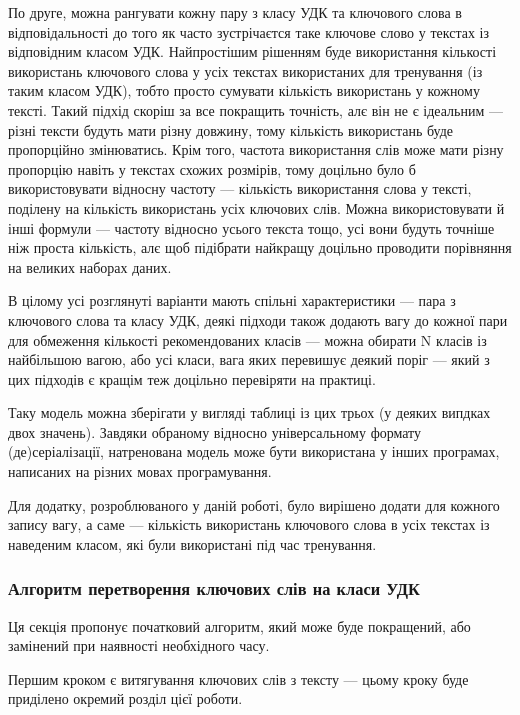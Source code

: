 \documentclass[14pt]{extarticle}
\begin{document}
  По друге, можна рангувати \cite{wiki_weight_function}
  кожну пару з класу УДК та ключового слова
  в відповідальності до того як часто зустрічаєтся таке ключове слово
  у текстах із відповідним класом УДК.
  Найпростішим рішенням буде використання кількості
  використань ключового слова у усіх текстах використаних для тренування
  (із таким класом УДК),
  тобто просто сумувати кількість використань у кожному тексті.
  Такий підхід скоріш за все покращить точність, алє він не є ідеальним ---
  різні тексти будуть мати різну довжину,
  тому кількість використань буде пропорційно змінюватись.
  Крім того, частота використання слів може мати різну пропорцію навіть
  у текстах схожих розмірів, тому доцільно було б використовувати відносну
  частоту --- кількість використання слова у тексті,
  поділену на кількість використань усіх ключових слів.
  Можна використовувати й інші формули ---
  частоту відносно усього текста тощо,
  усі вони будуть точніше ніж проста кількість,
  алє щоб підібрати найкращу доцільно проводити порівняння
  на великих наборах даних.

  В цілому усі розглянуті варіанти мають спільні характеристики ---
  пара з ключового слова та класу УДК,
  деякі підходи також додають вагу до кожної пари для обмеження кількості
  рекомендованих класів --- можна обирати N класів із найбільшою вагою,
  або усі класи, вага яких перевишує деякий поріг ---
  який з цих підходів є кращім теж доцільно перевіряти на практиці.

  Таку модель можна зберігати у вигляді таблиці із цих трьох
  (у деяких випдках двох значень).
  Завдяки обраному відносно універсальному формату (де)серіалізації,
  натренована модель може бути використана у інших програмах,
  написаних на різних мовах програмування.

  Для додатку, розроблюваного у даній роботі,
  було вирішено додати для кожного запису вагу,
  а саме --- кількість використань ключового слова
  в усіх текстах із наведеним  класом, які були використані під час тренування. 

  \subsubsection{Алгоритм перетворення ключових слів на класи УДК}
  Ця секція пропонує початковий алгоритм, який може буде покращений,
  або замінений при наявності необхідного часу.

  Першим кроком є витягування ключових слів з тексту ---
  цьому кроку буде приділено окремий розділ цієї роботи.
\end{document}
